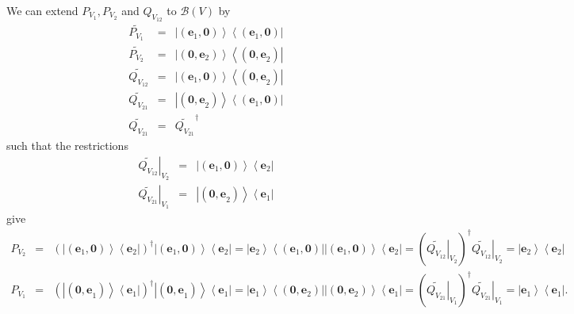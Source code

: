 \documentclass[aps,preprint]{revtex4}
\begin{document}
We can extend $P_{V_{1}},P_{V_{2}}$ and $Q_{V_{12}}$ to $\mathcal{B}\left(
V\right) $ by 
\begin{eqnarray}
\widetilde{P_{V_{1}}} &=&\left\vert \left( \mathbf{e}_{1},\mathbf{0}\right)
\right\rangle \left\langle \left( \mathbf{e}_{1}\mathbf{,0}\right)
\right\vert \\
\widetilde{P_{V_{2}}} &=&\left\vert \left( \mathbf{0},\mathbf{e}_{2}\right)
\right\rangle \left\langle \left( \mathbf{0,e}_{2}\right) \right\vert \\
\widetilde{Q_{V_{12}}} &=&\left\vert \left( \mathbf{e}_{1},\mathbf{0}\right)
\right\rangle \left\langle \left( \mathbf{0,e}_{2}\right) \right\vert \\
\widetilde{Q_{V_{21}}} &=&\left\vert \left( \mathbf{0,e}_{2}\right)
\right\rangle \left\langle \left( \mathbf{e}_{1},\mathbf{0}\right)
\right\vert \\
\widetilde{Q_{V_{21}}} &=&\widetilde{Q_{V_{21}}}^{\dagger }
\end{eqnarray}%
such that the restrictions 
\begin{eqnarray}
\left. \widetilde{Q_{V_{12}}}\right\vert _{V_{2}} &=&\left\vert \left( 
\mathbf{e}_{1},\mathbf{0}\right) \right\rangle \left\langle \mathbf{e}%
_{2}\right\vert \\
\left. \widetilde{Q_{V_{21}}}\right\vert _{V_{1}} &=&\left\vert \left( 
\mathbf{0,e}_{2}\right) \right\rangle \left\langle \mathbf{e}_{1}\right\vert
\end{eqnarray}
give%
\begin{eqnarray}
P_{V_{2}} &=&\left( \left\vert \left( \mathbf{e}_{1},\mathbf{0}\right)
\right\rangle \left\langle \mathbf{e}_{2}\right\vert \right) ^{\dagger
}\left\vert \left( \mathbf{e}_{1},\mathbf{0}\right) \right\rangle
\left\langle \mathbf{e}_{2}\right\vert =\left\vert \mathbf{e}%
_{2}\right\rangle \left\langle \left( \mathbf{e}_{1},\mathbf{0}\right)
\right\vert \left\vert \left( \mathbf{e}_{1},\mathbf{0}\right) \right\rangle
\left\langle \mathbf{e}_{2}\right\vert =\left( \left. \widetilde{Q_{V_{12}}}%
\right\vert _{V_{2}}\right) ^{\dagger }\left. \widetilde{Q_{V_{12}}}%
\right\vert _{V_{2}}=\left\vert \mathbf{e}_{2}\right\rangle \left\langle 
\mathbf{e}_{2}\right\vert \\
P_{V_{1}} &=&\left( \left\vert \left( \mathbf{0,e}_{1}\right) \right\rangle
\left\langle \mathbf{e}_{1}\right\vert \right) ^{\dagger }\left\vert \left( 
\mathbf{0,e}_{1}\right) \right\rangle \left\langle \mathbf{e}_{1}\right\vert
=\left\vert \mathbf{e}_{1}\right\rangle \left\langle \left( \mathbf{0},%
\mathbf{e}_{2}\right) \right\vert \left\vert \left( \mathbf{0},\mathbf{e}%
_{2}\right) \right\rangle \left\langle \mathbf{e}_{1}\right\vert =\left(
\left. \widetilde{Q_{V_{21}}}\right\vert _{V_{1}}\right) ^{\dagger }\left. 
\widetilde{Q_{V_{21}}}\right\vert _{V_{1}}=\left\vert \mathbf{e}%
_{1}\right\rangle \left\langle \mathbf{e}_{1}\right\vert .
\end{eqnarray}
\end{document}
